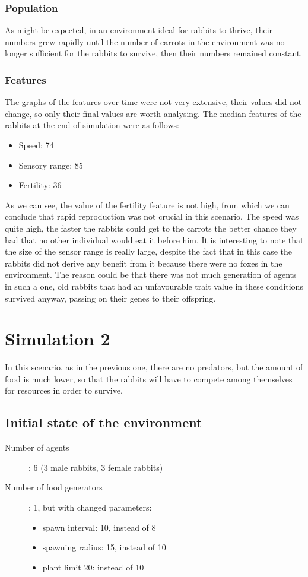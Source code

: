\subsubsection{Population}
As might be expected, in an environment ideal for rabbits to thrive, their numbers grew rapidly until the number of carrots in the environment was no longer sufficient for the rabbits to survive, then their numbers remained constant. 

\subsubsection{Features}

The graphs of the features over time were not very extensive, their values did not change, so only their final values are worth analysing. The median features of the rabbits at the end of simulation were as follows:
\begin{itemize}
    \item Speed: 74
    \item Sensory range: 85
    \item Fertility: 36
\end{itemize}

As we can see, the value of the fertility feature is not high, from which we can conclude that rapid reproduction was not crucial in this scenario. The speed was quite high, the faster the rabbits could get to the carrots the better chance they had that no other individual would eat it before him. It is interesting to note that the size of the sensor range is really large, despite the fact that in this case the rabbits did not derive any benefit from it because there were no foxes in the environment. The reason could be that there was not much generation of agents in such a one, old rabbits that had an unfavourable trait value in these conditions survived anyway, passing on their genes to their offspring.

\section{Simulation 2}
In this scenario, as in the previous one, there are no predators, but the amount of food is much lower, so that the rabbits will have to compete among themselves for resources in order to survive.
\subsection{Initial state of the environment}
\begin{description}
    \item[Number of agents]: 6 (3 male rabbits, 3 female rabbits)
    \item[Number of food generators]: 1, but with changed parameters:
    \begin{itemize}
        \item spawn interval: 10, instead of 8
        \item spawning radius: 15, instead of 10
        \item plant limit 20: instead of 10
    \end{itemize}
\end{description}

